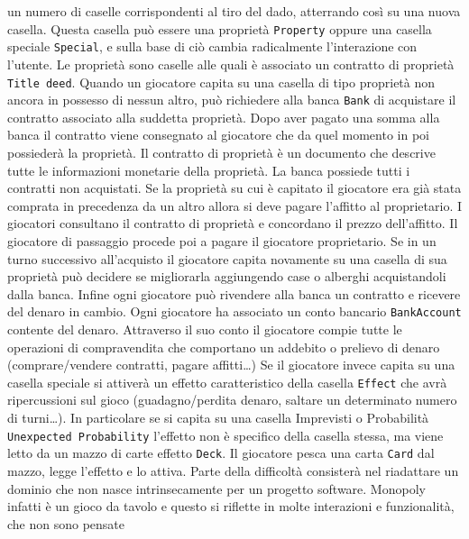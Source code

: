 un numero di caselle corrispondenti al tiro del dado, atterrando così su una nuova casella. 
Questa casella può essere una proprietà \texttt{Property} oppure una casella speciale \texttt{Special}, 
e sulla base di ciò cambia radicalmente l’interazione con l’utente.\newline
Le proprietà sono caselle alle quali è associato un contratto di proprietà \texttt{Title deed}. 
Quando un giocatore capita su una casella di tipo proprietà non ancora in possesso di nessun altro, può richiedere alla banca \texttt{Bank} di acquistare
il contratto associato alla suddetta proprietà.
Dopo aver pagato una somma alla banca il contratto viene consegnato al giocatore che da quel momento in poi possiederà la proprietà.
Il contratto di proprietà è un documento che descrive tutte le informazioni monetarie della proprietà.
La banca possiede tutti i contratti non acquistati.\newline
Se la proprietà su cui è capitato il giocatore era già stata comprata in precedenza da un altro allora si 
deve pagare l'affitto al proprietario. I giocatori consultano il contratto di proprietà e concordano il prezzo dell'affitto.
Il giocatore di passaggio procede poi a pagare il giocatore proprietario.\newline
Se in un turno successivo all'acquisto il giocatore capita novamente su una casella di sua proprietà può decidere se migliorarla aggiungendo case 
o alberghi acquistandoli dalla banca.
Infine ogni giocatore può rivendere alla banca un contratto e ricevere del denaro in cambio.
Ogni giocatore ha associato un conto bancario  \texttt{BankAccount} contente del denaro. Attraverso il suo conto
il giocatore compie tutte le operazioni di compravendita che comportano un addebito o prelievo di denaro (comprare/vendere contratti, pagare affitti\dots)\newline
Se il giocatore invece capita su una casella speciale si attiverà un effetto caratteristico della casella \texttt{Effect}
che avrà ripercussioni sul gioco 
(guadagno/perdita denaro, saltare un determinato numero di turni\dots). 
In particolare se si capita su una casella Imprevisti o Probabilità \texttt{Unexpected Probability} l'effetto non 
è specifico della casella stessa, ma viene letto da un mazzo di carte effetto \texttt{Deck}. 
Il giocatore pesca una carta \texttt{Card} dal mazzo, legge l'effetto e lo attiva.\smallskip\newline
Parte della difficoltà consisterà nel riadattare un dominio che non nasce intrinsecamente per un progetto software.
Monopoly infatti è un gioco da tavolo e questo si riflette in molte interazioni e funzionalità, che non sono pensate 

